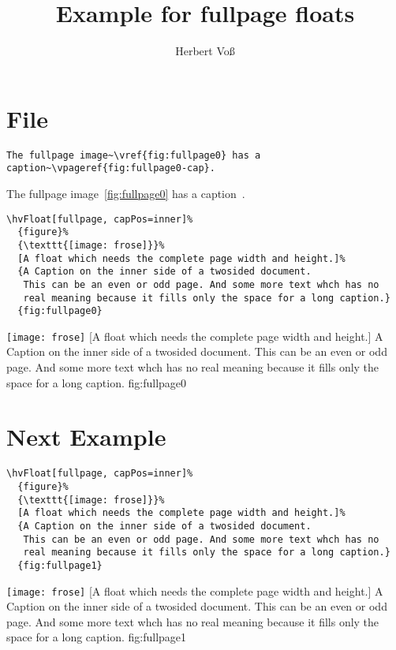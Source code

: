 \documentclass[twoside,twocolumn]{scrartcl}
\begin{document}
\title{Example for fullpage floats}
\author{Herbert Voß}
\maketitle

\tableofcontents

\blinddocument

\section{File \texttt{\jobname}}

\begin{lstlisting}
The fullpage image~\vref{fig:fullpage0} has a caption~\vpageref{fig:fullpage0-cap}.
\end{lstlisting}

The fullpage image~\vref{fig:fullpage0} has a caption~.

\begin{lstlisting}
\hvFloat[fullpage, capPos=inner]%
  {figure}%
  {\texttt{[image: frose]}}%
  [A float which needs the complete page width and height.]%
  {A Caption on the inner side of a twosided document. 
   This can be an even or odd page. And some more text whch has no
   real meaning because it fills only the space for a long caption.}
  {fig:fullpage0}
\end{lstlisting}

\Float[capPos=e]
%
  {\texttt{[image: frose]}}%
  [A float which needs the complete page width and height.]%
  {A Caption on the inner side of a twosided document. 
   This can be an even or odd page. And some more text whch has no
   real meaning because it fills only the space for a long caption.}
  {fig:fullpage0}

\blinddocument

\section{Next Example}

\begin{lstlisting}
\hvFloat[fullpage, capPos=inner]%
  {figure}%
  {\texttt{[image: frose]}}%
  [A float which needs the complete page width and height.]%
  {A Caption on the inner side of a twosided document. 
   This can be an even or odd page. And some more text whch has no
   real meaning because it fills only the space for a long caption.}
  {fig:fullpage1}
\end{lstlisting}


\Float[capPos=e]
%
  {\texttt{[image: frose]}}%
  [A float which needs the complete page width and height.]%
  {A Caption on the inner side of a twosided document. 
   This can be an even or odd page. And some more text whch has no
   real meaning because it fills only the space for a long caption.}
  {fig:fullpage1}

\blinddocument


\Blindtext
\end{document}
